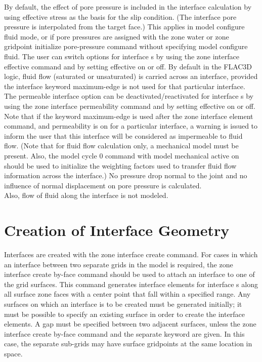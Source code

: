 \documentclass[a4paper, nobind]{templates/ociamthesis}
\begin{document}
By default, the effect of pore pressure is included in the interface
calculation by using effective stress as the basis for the slip
condition. (The interface pore pressure is interpolated from the target
face.) This applies in model configure fluid mode, or if pore pressures
are assigned with the zone water or zone gridpoint initialize
pore-pressure command without specifying model configure fluid. The user
can switch options for interface s by using the zone interface effective
command and by setting effective on or off. By default in the FLAC3D
logic, fluid flow (saturated or unsaturated) is carried across an
interface, provided the interface keyword maximum-edge is not used for
that particular interface. The permeable interface option can be
deactivated/reactivated for interface s by using the zone interface
permeability command and by setting effective on or off. Note that if
the keyword maximum-edge is used after the zone interface element
command, and permeability is on for a particular interface, a warning is
issued to inform the user that this interface will be considered as
impermeable to fluid flow. (Note that for fluid flow calculation only, a
mechanical model must be present. Also, the model cycle 0 command with
model mechanical active on should be used to initialize the weighting
factors used to transfer fluid flow information across the interface.)
No pressure drop normal to the joint and no influence of normal
displacement on pore pressure is calculated.\\

Also, flow of fluid along the interface is not modeled.\\

\hypertarget{creation-of-interface-geometry}{%
\section{Creation of Interface Geometry}\label{creation-of-interface-geometry}}

Interfaces are created with the zone interface create command. For cases
in which an interface between two separate grids in the model is
required, the zone interface create by-face command should be used to
attach an interface to one of the grid surfaces. This command generates
interface elements for interface s along all surface zone faces with a
center point that fall within a specified range. Any surfaces on which
an interface is to be created must be generated initially; it must be
possible to specify an existing surface in order to create the interface
elements. A gap must be specified between two adjacent surfaces, unless
the zone interface create by-face command and the separate keyword are
given. In this case, the separate sub-grids may have surface gridpoints
at the same location in space.\\
\end{document}
